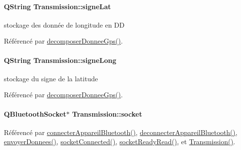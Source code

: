 \paragraph[{\texorpdfstring{signe\+Lat}{signeLat}}]{\setlength{\rightskip}{0pt plus 5cm}Q\+String Transmission\+::signe\+Lat\hspace{0.3cm}{\ttfamily [private]}}\hypertarget{class_transmission_aecd312863e33ce32d811895bc143b265}{}\label{class_transmission_aecd312863e33ce32d811895bc143b265}
stockage des donnée de longitude en DD 

Référencé par \hyperlink{class_transmission_acc25e99cce910d23efe684cad233d30e}{decomposer\+Donnee\+Gps()}.

\paragraph[{\texorpdfstring{signe\+Long}{signeLong}}]{\setlength{\rightskip}{0pt plus 5cm}Q\+String Transmission\+::signe\+Long\hspace{0.3cm}{\ttfamily [private]}}\hypertarget{class_transmission_a80f29bafb41f10f5be97ebaced6e684a}{}\label{class_transmission_a80f29bafb41f10f5be97ebaced6e684a}
stockage du signe de la latitude 

Référencé par \hyperlink{class_transmission_acc25e99cce910d23efe684cad233d30e}{decomposer\+Donnee\+Gps()}.

\paragraph[{\texorpdfstring{socket}{socket}}]{\setlength{\rightskip}{0pt plus 5cm}Q\+Bluetooth\+Socket$\ast$ Transmission\+::socket\hspace{0.3cm}{\ttfamily [private]}}\hypertarget{class_transmission_a0b579c9da71d4b19f0504241ffbfae21}{}\label{class_transmission_a0b579c9da71d4b19f0504241ffbfae21}


Référencé par \hyperlink{class_transmission_a5a21d201dd0096f96aec12264c2f03d9}{connecter\+Appareil\+Bluetooth()}, \hyperlink{class_transmission_afc5d716d53ee7039c3abf05f799327ae}{deconnecter\+Appareil\+Bluetooth()}, \hyperlink{class_transmission_a21e35372ada18cd35411c0e8c0984fd7}{envoyer\+Donnees()}, \hyperlink{class_transmission_ad231163c435936cc69149dd03aaaf473}{socket\+Connected()}, \hyperlink{class_transmission_a3beab187cc2056a8f34bc6643fdc0e26}{socket\+Ready\+Read()}, et \hyperlink{class_transmission_a1d8087d2d09b9ddd4fd6e8261daed9f3}{Transmission()}.

